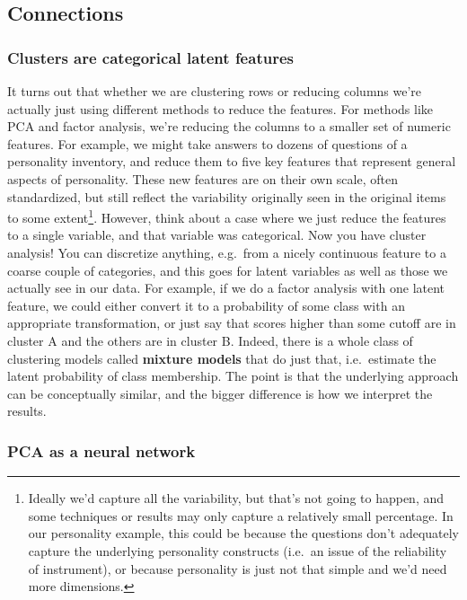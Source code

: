 \documentclass[
  letterpaper,
]{krantz}
\begin{document}
\subsection{Connections}\label{connections}

\subsubsection{Clusters are categorical latent
features}\label{clusters-are-categorical-latent-features}

It turns out that whether we are clustering rows or reducing columns
we're actually just using different methods to reduce the features. For
methods like PCA and factor analysis, we're reducing the columns to a
smaller set of numeric features. For example, we might take answers to
dozens of questions of a personality inventory, and reduce them to five
key features that represent general aspects of personality. These new
features are on their own scale, often standardized, but still reflect
the variability originally seen in the original items to some
extent\footnote{Ideally we'd capture all the variability, but that's not
  going to happen, and some techniques or results may only capture a
  relatively small percentage. In our personality example, this could be
  because the questions don't adequately capture the underlying
  personality constructs (i.e.~an issue of the reliability of
  instrument), or because personality is just not that simple and we'd
  need more dimensions.}. However, think about a case where we just
reduce the features to a single variable, and that variable was
categorical. Now you have cluster analysis! You can discretize anything,
e.g.~from a nicely continuous feature to a coarse couple of categories,
and this goes for latent variables as well as those we actually see in
our data. For example, if we do a factor analysis with one latent
feature, we could either convert it to a probability of some class with
an appropriate transformation, or just say that scores higher than some
cutoff are in cluster A and the others are in cluster B. Indeed, there
is a whole class of clustering models called \textbf{mixture models}
that do just that, i.e.~estimate the latent probability of class
membership. The point is that the underlying approach can be
conceptually similar, and the bigger difference is how we interpret the
results.

\subsubsection{PCA as a neural network}\label{pca-as-a-neural-network}
\end{document}
